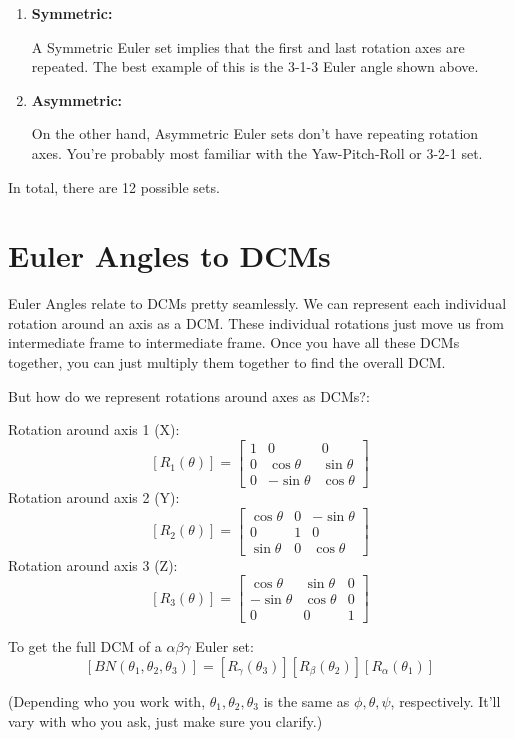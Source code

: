 \documentclass[a4paper,14pt]{extreport}
\begin{document}
\begin{enumerate}
\item{\textbf{Symmetric:}

A Symmetric Euler set implies that the first and last rotation axes are repeated. The best example of this is the 3-1-3 Euler angle shown above.}

\item{\textbf{Asymmetric:}

On the other hand, Asymmetric Euler sets don't have repeating rotation axes. You're probably most familiar with the Yaw-Pitch-Roll or 3-2-1 set.}
\end{enumerate}

In total, there are 12 possible sets.
\section{Euler Angles to DCMs}
Euler Angles relate to DCMs pretty seamlessly. We can represent each individual rotation around an axis as a DCM. These individual rotations just move us from intermediate frame to intermediate frame. Once you have all these DCMs together, you can just multiply them together to find the overall DCM. 

But how do we represent rotations around axes as DCMs?:
\begin{center}
Rotation around axis 1 (X):
\[[R_1(\theta)] = \begin{bmatrix}
			1&0&0\\
			0&\cos{\theta}&\sin{\theta}\\
			0&-\sin{\theta}&\cos{\theta}
	\end{bmatrix}\]	
Rotation around axis 2 (Y):
\[[R_2(\theta)] = \begin{bmatrix}
		\cos{\theta}&0&-\sin{\theta}\\
		0&1&0\\
		\sin{\theta}&0&\cos{\theta}
	\end{bmatrix}\]
Rotation around axis 3 (Z):
\[[R_3(\theta)] = \begin{bmatrix}
		\cos{\theta}&\sin{\theta}&0\\
		-\sin{\theta}&\cos{\theta}&0\\
		0&0&1
	\end{bmatrix}\]

To get the full DCM of a $\alpha\beta\gamma$ Euler set:
\[[BN(\theta_1,\theta_2,\theta_3)] = [R_\gamma(\theta_3)][R_\beta(\theta_2)][R_\alpha(\theta_1)]\]
\end{center}
(Depending who you work with, $\theta_1,\theta_2,\theta_3$ is the same as $\phi,\theta,\psi$, respectively. It'll vary with who you ask, just make sure you clarify.)
\end{document}
